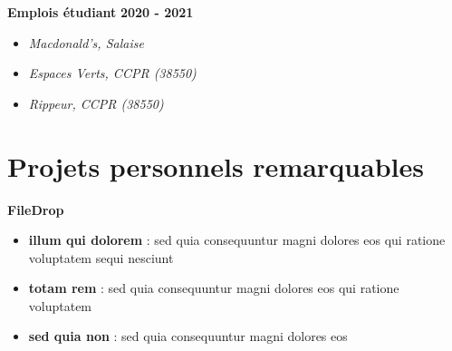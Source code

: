 \documentclass[a4paper,10pt]{article}
\begin{document}
\begin{paracol}{2}
\begin{flushleft}
  \textbf{Emplois étudiant} \hfill \textbf{2020 - 2021} \\
  \begin{itemize}[left=0pt,label={--},nosep]
    \item \textit{Macdonald's, Salaise} \\
    \item \textit{Espaces Verts, CCPR (38550)} \\
    \item \textit{Rippeur, CCPR (38550)} \\
  \end{itemize}
\end{flushleft}

\section*{Projets personnels remarquables}

\textbf{FileDrop}
\begin{itemize}[left=0pt,label={--},nosep]
  \item \textbf{illum qui dolorem} : sed quia consequuntur magni dolores eos qui ratione voluptatem sequi nesciunt
  \item \textbf{totam rem} : sed quia consequuntur magni dolores eos qui ratione voluptatem
  \item \textbf{sed quia non} : sed quia consequuntur magni dolores eos
  \vspace{1em}
\end{itemize}
  
\end{paracol}
\end{document}
